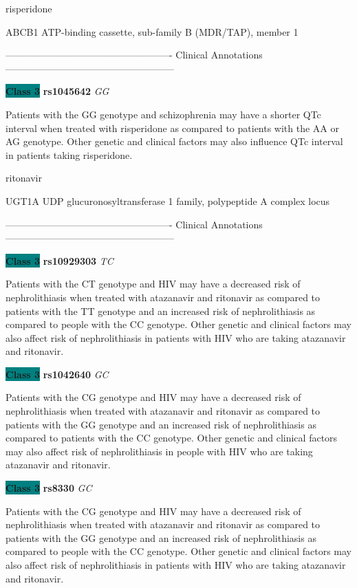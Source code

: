 \documentclass{resume} %
\begin{document}
\begin{rSection}{ risperidone }
\begin{rSubsection}{ ABCB1 }{ ATP-binding cassette, sub-family B (MDR/TAP), member 1 }{}{}
\item[] ---------------------------------------------------- Clinical Annotations -----------------------------------------------------\newline
\item \textbf{\colorbox{teal} {Class 3}} \textbf{ rs1045642 } \textit{ GG }
\item[] Patients with the GG genotype and schizophrenia may have a shorter QTc interval when treated with risperidone as compared to patients with the AA or AG genotype. Other genetic and clinical factors may also influence QTc interval in patients taking risperidone.
\end{rSubsection}

\end{rSection}\begin{rSection}{ ritonavir }
\item[]

\begin{rSubsection}{ UGT1A }{ UDP glucuronosyltransferase 1 family, polypeptide A complex locus }{}{}
\item[]

\item[] ---------------------------------------------------- Clinical Annotations -----------------------------------------------------\newline
\item \textbf{\colorbox{teal} {Class 3}} \textbf{ rs10929303 } \textit{ TC }
\item[] Patients with the CT genotype and HIV may have a decreased risk of nephrolithiasis when treated with atazanavir and ritonavir as compared to patients with the TT genotype and an increased risk of nephrolithiasis as compared to people with the CC genotype. Other genetic and clinical factors may also affect risk of nephrolithiasis in patients with HIV who are taking atazanavir and ritonavir. \item \textbf{\colorbox{teal} {Class 3}} \textbf{ rs1042640 } \textit{ GC }
\item[] Patients with the CG genotype and HIV may have a decreased risk of nephrolithiasis when treated with atazanavir and ritonavir as compared to patients with the GG genotype and an increased risk of nephrolithiasis as compared to patients with the CC genotype. Other genetic and clinical factors may also affect risk of nephrolithiasis in people with HIV who are taking atazanavir and ritonavir.\item \textbf{\colorbox{teal} {Class 3}} \textbf{ rs8330 } \textit{ GC }
\item[] Patients with the CG genotype and HIV may have a decreased risk of nephrolithiasis when treated with atazanavir and ritonavir as compared to patients with the GG genotype and an increased risk of nephrolithiasis as compared to people with the CC genotype. Other genetic and clinical factors may also affect risk of nephrolithiasis in patients with HIV who are taking atazanavir and ritonavir.
\end{rSubsection}


\end{rSection}
\end{document}
